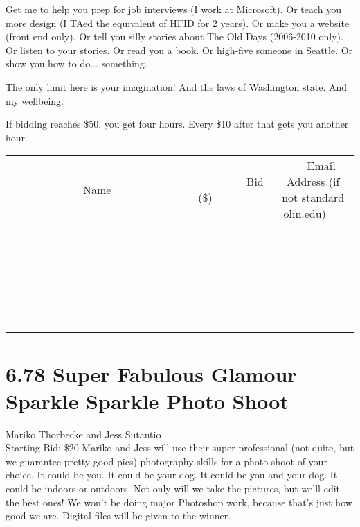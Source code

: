 \documentclass[11pt]{article}
\begin{document}
Get me to help you prep for job interviews (I work at Microsoft). Or teach you more design (I TAed the equivalent of HFID for 2 years). Or make you a website (front end only). Or tell you silly stories about The Old Days (2006-2010 only). Or listen to your stories. Or read you a book. Or high-five someone in Seattle. Or show you how to do... something.

The only limit here is your imagination! And the laws of Washington state. And my wellbeing.


If bidding reaches \$50, you get four hours. Every \$10 after that gets you another hour.
\\[6ex]
\begin{tabular}{c c c}
~~~~~~~~~~~~~Name~~~~~~~~~~~~~ & ~~~~~~~~~Bid (\$)~~~~~~~~~  & ~~~Email Address (if not standard olin.edu)~~~\\
 & & \\
\hline
 & & \\
\hline
 & & \\
\hline
 & & \\
\hline
 & & \\
\hline
 & & \\
\hline
 & & \\
\hline
 & & \\
\hline
 & & \\
\hline
 & & \\
\hline
 & & \\
\hline
 & & \\
\hline
 & & \\
\hline
 & & \\
\hline
 & & \\
\hline
 & & \\
\hline
 & & \\
\hline
 & & \\
\hline
 & & \\
\hline
 & & \\
\hline
 & & \\
\hline
 & & \\
\hline
 & & \\
\hline
 & & \\
\hline
 & & \\
\hline
 & & \\
\hline
\end{tabular}
\newpage
\section*{6.78 Super Fabulous Glamour Sparkle Sparkle Photo Shoot}
Mariko Thorbecke and Jess Sutantio
\\
Starting Bid: \$20
\newline
Mariko and Jess will use their super professional (not quite, but we guarantee pretty good pics) photography skills for a photo shoot of your choice. It could be you. It could be your dog. It could be you and your dog. It could be indoors or outdoors. Not only will we take the pictures, but we'll edit the best ones! We won't be doing major Photoshop work, because that's just how good we are. Digital files will be given to the winner. 
\end{document}
